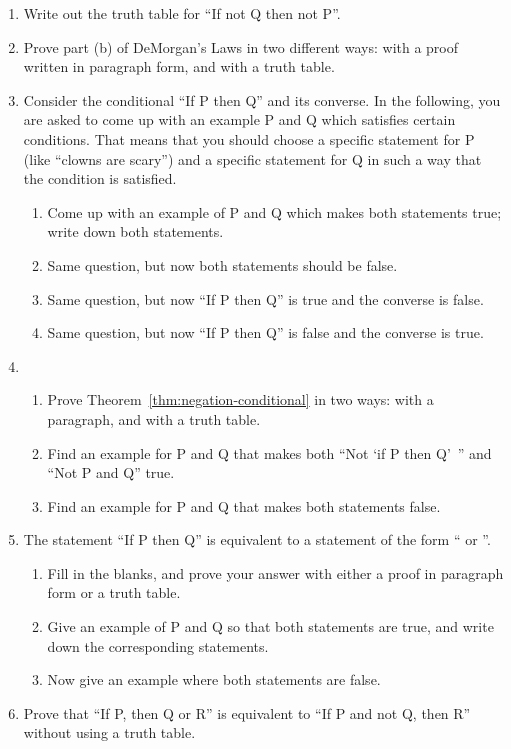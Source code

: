 \probsec{~\ref{sec:negat-logic-equiv}}
\begin{enumerate}
    \item Write out the truth table for ``If not Q then not P''.

    \item Prove part (b) of DeMorgan's Laws in two different ways: with a proof written in paragraph form, and with a truth table.

    \item Consider the conditional ``If P then Q'' and its converse. In the following, you are asked to come up with an example P and Q which satisfies certain conditions. That means that you should choose a specific statement for P (like ``clowns are scary'') and a specific statement for Q in such a way that the condition is satisfied.
  \begin{enumerate}
      \item Come up with an example of P and Q which makes both statements true; write down both statements.
      \item Same question, but now both statements should be false.
      \item Same question, but now ``If P then Q'' is true and the converse is false.
      \item Same question, but now ``If P then Q'' is false and the converse is true.
  \end{enumerate}

    \item 
  \begin{enumerate}
      \item Prove Theorem~\ref{thm:negation-conditional} in two ways: with a paragraph, and with a truth table.
      \item Find an example for P and Q that makes both ``Not `if P then Q'~'' and ``Not P and Q'' true.
      \item Find an example for P and Q that makes both statements false.
  \end{enumerate}

    \item The statement ``If P then Q'' is equivalent to a statement of the form ``\underline{\hspace{.5in}} or \underline{\hspace{.5in}}''.
  \begin{enumerate}
      \item Fill in the blanks, and prove your answer with either a proof in paragraph form or a truth table.
      \item Give an example of P and Q so that both statements are true, and write down the corresponding statements.
      \item Now give an example where both statements are false.
  \end{enumerate}

    \item Prove that ``If P, then Q or R'' is equivalent to ``If P and not Q, then R'' without using a truth table.

\end{enumerate}
